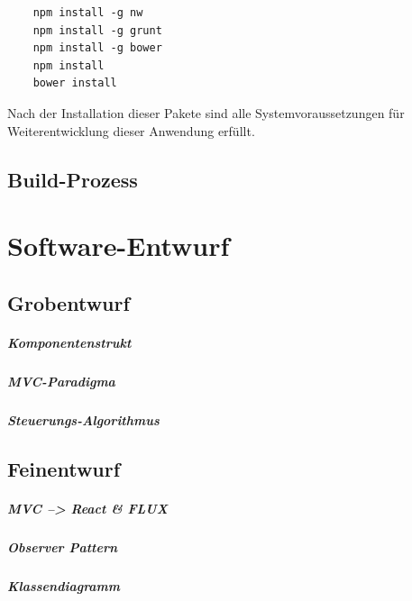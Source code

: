 \begin{lstlisting}
	npm install -g nw
	npm install -g grunt
	npm install -g bower
	npm install
	bower install
\end{lstlisting}

Nach der Installation dieser Pakete sind alle Systemvoraussetzungen für Weiterentwicklung dieser Anwendung erfüllt. 

\section{Build-Prozess}

\chapter{Software-Entwurf}
\section{Grobentwurf}

\paragraph{Komponentenstrukt}
\paragraph{MVC-Paradigma}
\paragraph{Steuerungs-Algorithmus}

\section{Feinentwurf}

\paragraph{MVC --> React \& FLUX}
\paragraph{Observer Pattern}
\paragraph{Klassendiagramm}


